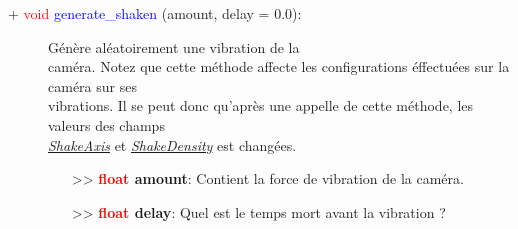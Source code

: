 \documentclass[a4paper, 11pt]{article}
\begin{document}
	\begin{description}
		\item [+ \textcolor{red}{void} \textcolor{blue}{generate\_shaken} (amount, delay = 0.0):] Génère 
		aléatoirement une vibration de la \\caméra. Notez que cette méthode affecte les configurations 
		éffectuées sur la caméra sur ses \\vibrations. Il se peut donc qu'après une appelle de cette 
		méthode, les valeurs des champs \textit{\hyperlink{shkaxis}{\\ShakeAxis}} et 
		\textit{\hyperlink{shkden}{ShakeDensity}} est changées.
		\begin{itemize}
			\item [>> \textbf{\textcolor{red}{float} amount}:] Contient la force de vibration de la caméra.
			\item [>> \textbf{\textcolor{red}{float} delay}:] Quel est le temps mort avant la vibration ?
		\end{itemize}
	\end{description}

\end{document}
